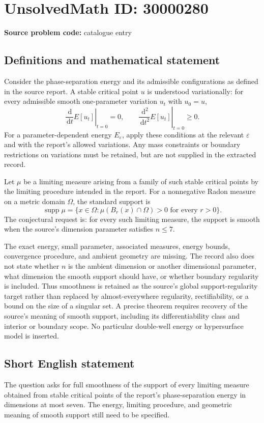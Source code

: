 \documentclass[11pt]{article}
\newcommand{\dd}{\,\mathrm{d}}
\begin{document}
\section*{UnsolvedMath ID: 30000280}
\textbf{Source problem code:} catalogue entry
\subsection{Definitions and mathematical statement}
Consider the phase-separation energy and its admissible configurations as defined in the source report. A stable critical point $u$ is understood variationally: for every admissible smooth one-parameter variation $u_t$ with $u_0=u$,
\[
 \left.\frac{\dd}{\dd t}E[u_t]\right|_{t=0}=0,
 \qquad
 \left.\frac{\dd^2}{\dd t^2}E[u_t]\right|_{t=0}\ge0.
\]
For a parameter-dependent energy $E_\varepsilon$, apply these conditions at the relevant $\varepsilon$ and with the report's allowed variations. Any mass constraints or boundary restrictions on variations must be retained, but are not supplied in the extracted record.

Let $\mu$ be a limiting measure arising from a family of such stable critical points by the limiting procedure intended in the report. For a nonnegative Radon measure on a metric domain $\Omega$, the standard support is
\[
 \operatorname{supp}\mu
 =\{x\in\Omega:\mu(B_r(x)\cap\Omega)>0\text{ for every }r>0\}.
\]
The conjectural request is: for every such limiting measure, the support is smooth when the source's dimension parameter satisfies $n\le7$.

The exact energy, small parameter, associated measures, energy bounds, convergence procedure, and ambient geometry are missing. The record also does not state whether $n$ is the ambient dimension or another dimensional parameter, what dimension the smooth support should have, or whether boundary regularity is included. Thus smoothness is retained as the source's global support-regularity target rather than replaced by almost-everywhere regularity, rectifiability, or a bound on the size of a singular set. A precise theorem requires recovery of the source's meaning of smooth support, including its differentiability class and interior or boundary scope. No particular double-well energy or hypersurface model is inserted.
\subsection{Short English statement}
The question asks for full smoothness of the support of every limiting measure obtained from stable critical points of the report's phase-separation energy in dimensions at most seven. The energy, limiting procedure, and geometric meaning of smooth support still need to be specified.
\end{document}
